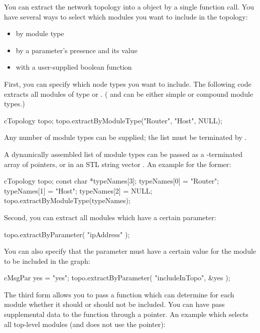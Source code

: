 You can extract the network topology into a 
object by a single function call. You have several ways to select
which modules you want to include in the topology:
\begin{itemize}
  \item{by module type}
  \item{by a parameter's presence and its value}
  \item{with a user-supplied boolean function}
\end{itemize}

First, you can specify which node types you want to include. The
following code extracts all modules of type  or .
( and  can be either simple or compound module types.)

\begin{cpp}
cTopology topo;
topo.extractByModuleType("Router", "Host", NULL);
\end{cpp}

Any number of module types can be supplied; the list must be terminated by .

A dynamically assembled list of module types can be passed as a
-terminated array of  pointers, or
in an STL string vector .
An example for the former:

\begin{cpp}
cTopology topo;
const char *typeNames[3];
typeNames[0] = "Router";
typeNames[1] = "Host";
typeNames[2] = NULL;
topo.extractByModuleType(typeNames);
\end{cpp}

Second, you can extract all modules which have a certain parameter:

\begin{cpp}
topo.extractByParameter( "ipAddress" );
\end{cpp}

You can also specify that the parameter must have a certain value
for the module to be included in the graph:

\begin{cpp}
cMsgPar yes = "yes";
topo.extractByParameter( "includeInTopo", &yes );
\end{cpp}

The third form allows you to pass a function which can determine for
each module whether it should or should not be included.  You can have
 pass supplemental data to the function through a
 pointer. An example which selects all top-level modules (and
does not use the  pointer):

